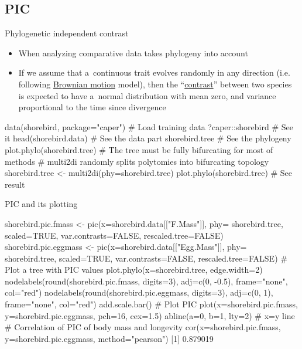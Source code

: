 \documentclass[compress, xelatex, 11pt, xcolor=svgnames, aspectratio=169,
	hyperref={
		bookmarks=true,
		unicode=true,
		colorlinks=true,
		pdftitle={Molecular data in R},
		plainpages=false,
		pdfauthor={Vojtech Zeisek},
		pdfsubject={Course about phylogeny and evolution in R},
		pdfcreator={XeLaTeX},
		pdfkeywords={R, evolution, phylogeny, molecular data},
		linkcolor=Crimson, %
		anchorcolor=Magenta, %
		citecolor=Magenta, %
		filecolor=Magenta, %
		menucolor=Magenta, %
		urlcolor=DodgerBlue, %
		},
	url={hyphens, lowtilde} %
	]{beamer}
\begin{document}
\subsection{PIC}

\begin{frame}[fragile]{Phylogenetic independent contrast}
	\begin{itemize}
		\item When analyzing comparative data takes phylogeny into account
		\item If we assume that a~continuous trait evolves randomly in any direction (i.e. following \href{https://en.wikipedia.org/wiki/Brownian_motion}{Brownian motion} model), then the \enquote{\href{https://en.wikipedia.org/wiki/Contrast_(statistics)}{contrast}} between two species is expected to have a~normal distribution with mean zero, and variance proportional to the time since divergence
	\end{itemize}
	\begin{spluscode}
    data(shorebird, package="caper") # Load training data
    ?caper::shorebird # See it
    head(shorebird.data) # See the data part
    shorebird.tree # See the phylogeny
    plot.phylo(shorebird.tree)
    # The tree must be fully bifurcating for most of methods
    # multi2di randomly splits polytomies into bifurcating topology
    shorebird.tree <- multi2di(phy=shorebird.tree)
    plot.phylo(shorebird.tree) # See result
	\end{spluscode}
\end{frame}

\begin{frame}[fragile]{PIC and its plotting}
	\begin{spluscode}
    shorebird.pic.fmass <- pic(x=shorebird.data[["F.Mass"]], phy=
      shorebird.tree, scaled=TRUE, var.contrasts=FALSE, rescaled.tree=FALSE)
    shorebird.pic.eggmass <- pic(x=shorebird.data[["Egg.Mass"]], phy=
      shorebird.tree, scaled=TRUE, var.contrasts=FALSE, rescaled.tree=FALSE)
    # Plot a tree with PIC values
    plot.phylo(x=shorebird.tree, edge.width=2)
    nodelabels(round(shorebird.pic.fmass, digits=3), adj=c(0, -0.5),
      frame="none", col="red")
    nodelabels(round(shorebird.pic.eggmass, digits=3), adj=c(0, 1),
      frame="none", col="red")
    add.scale.bar()
    # Plot PIC
    plot(x=shorebird.pic.fmass, y=shorebird.pic.eggmass, pch=16, cex=1.5)
    abline(a=0, b=1, lty=2) # x=y line
    # Correlation of PIC of body mass and longevity
    cor(x=shorebird.pic.fmass, y=shorebird.pic.eggmass, method="pearson")
    [1] 0.879019
	\end{spluscode}
\end{frame}
\end{document}

